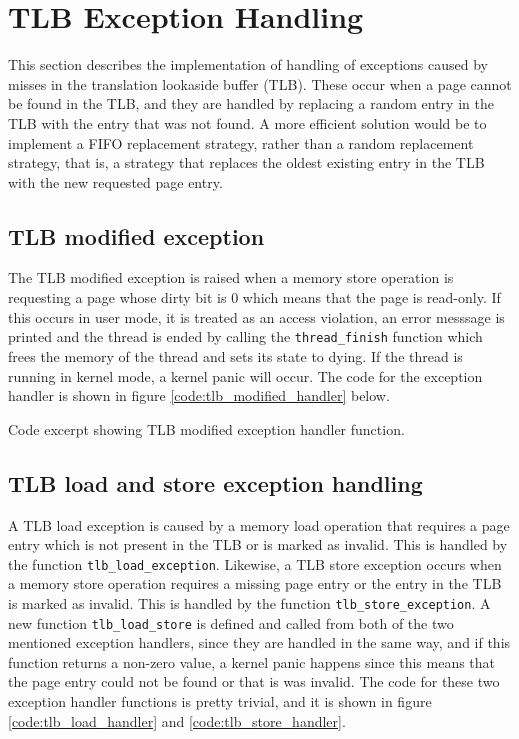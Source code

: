 %
%
%

\section{TLB Exception Handling}
This section describes the implementation of handling of exceptions caused by
misses in the translation lookaside buffer (TLB). These occur when a page cannot
be found in the TLB, and they are handled by replacing a random entry in the TLB
with the entry that was not found. A more efficient solution would be to
implement a FIFO replacement strategy, rather than a random replacement
strategy, that is, a strategy that replaces the oldest existing entry in
the TLB with the new requested page entry.

\subsection{TLB modified exception}
The TLB modified exception is raised when a memory store operation is requesting
a page whose dirty bit is 0 which means that the page is read-only. If this
occurs in user mode, it is treated as an access violation, an error messsage is
printed and the thread is ended by calling the \verb|thread_finish| function
which frees the memory of the thread and sets its state to dying. If the
thread is running in kernel mode, a kernel panic will occur. The code for the
exception handler is shown in figure \ref{code:tlb_modified_handler} below.

{Code excerpt showing TLB modified exception handler function.}

\subsection{TLB load and store exception handling}
A TLB load exception is caused by a memory load operation that requires a page
entry which is not present in the TLB or is marked as invalid. This is handled
by the function \verb|tlb_load_exception|. Likewise, a TLB store exception
occurs when a memory store operation requires a missing page entry or the entry
in the TLB is marked as invalid. This is handled by the function
\verb|tlb_store_exception|. A new function \verb|tlb_load_store| is defined and
called from both of the two mentioned exception handlers, since they are handled
in the same way, and if this function returns a non-zero value, a kernel panic
happens since this means that the page entry could not be found or that is was
invalid. The code for these two exception handler functions is pretty trivial, 
and it is shown in figure \ref{code:tlb_load_handler} and
\ref{code:tlb_store_handler}.

